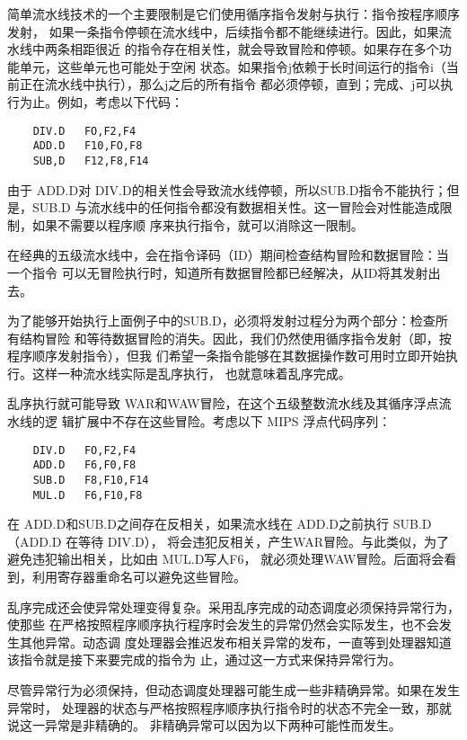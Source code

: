 简单流水线技术的一个主要限制是它们使用循序指令发射与执行：指令按程序顺序发射，
如果一条指令停顿在流水线中，后续指令都不能继续进行。因此，如果流水线中两条相距很近
的指令存在相关性，就会导致冒险和停顿。如果存在多个功能单元，这些单元也可能处于空闲
状态。如果指令j依赖于长时间运行的指令i（当前正在流水线中执行），那么j之后的所有指令
都必须停顿，直到；完成、j可以执行为止。例如，考虑以下代码：

\begin{verbatim}
    DIV.D   FO,F2,F4
    ADD.D   F10,FO,F8
    SUB,D   F12,F8,F14
\end{verbatim}

由于 ADD.D对 DIV.D的相关性会导致流水线停顿，所以SUB.D指令不能执行；但是，SUB.D
与流水线中的任何指令都没有数据相关性。这一冒险会对性能造成限制，如果不需要以程序顺
序来执行指令，就可以消除这一限制。

在经典的五级流水线中，会在指令译码（ID）期间检查结构冒险和数据冒险：当一个指令
可以无冒险执行时，知道所有数据冒险都已经解决，从ID将其发射出去。

为了能够开始执行上面例子中的SUB.D，必须将发射过程分为两个部分：检查所有结构冒险
和等待数据冒险的消失。因此，我们仍然使用循序指令发射（即，按程序顺序发射指令），但我
们希望一条指令能够在其数据操作数可用时立即开始执行。这样一种流水线实际是乱序执行，
也就意味着乱序完成。

乱序执行就可能导致 WAR和WAW冒险，在这个五级整数流水线及其循序浮点流水线的逻
辑扩展中不存在这些冒险。考虑以下 MIPS 浮点代码序列：

\begin{verbatim}
    DIV.D   FO,F2,F4
    ADD.D   F6,F0,F8
    SUB.D   F8,F10,F14
    MUL.D   F6,F10,F8
\end{verbatim}

在 ADD.D和SUB.D之间存在反相关，如果流水线在 ADD.D之前执行 SUB.D（ADD.D 在等待 DIV.D），
将会违犯反相关，产生WAR冒险。与此类似，为了避免违犯输出相关，比如由 MUL.D写人F6，
就必须处理WAW冒险。后面将会看到，利用寄存器重命名可以避免这些冒险。

乱序完成还会使异常处理变得复杂。采用乱序完成的动态调度必须保持异常行为，使那些
在严格按照程序顺序执行程序时会发生的异常仍然会实际发生，也不会发生其他异常。动态调
度处理器会推迟发布相关异常的发布，一直等到处理器知道该指令就是接下来要完成的指令为
止，通过这一方式来保持异常行为。

尽管异常行为必须保持，但动态调度处理器可能生成一些非精确异常。如果在发生异常时，
处理器的状态与严格按照程序顺序执行指令时的状态不完全一致，那就说这一异常是非精确的。
非精确异常可以因为以下两种可能性而发生。


